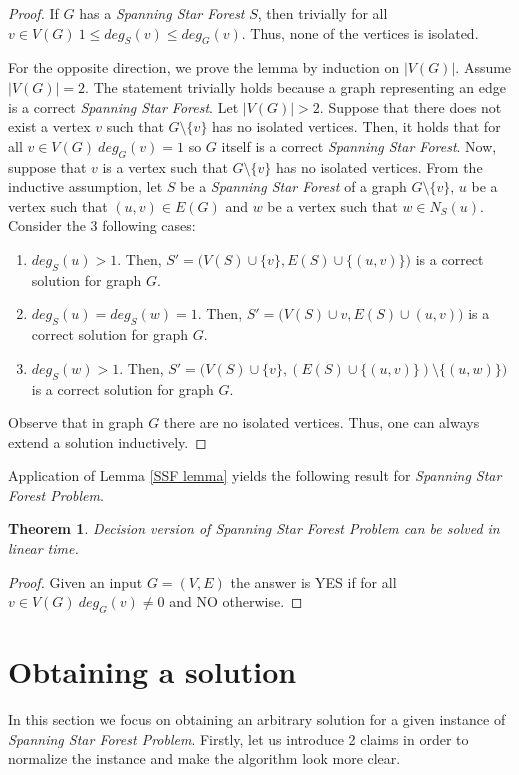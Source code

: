 \documentclass[en]{pracamgr}
\newtheorem{theorem}{Theorem}
\newcommand{\ssf}{\emph{Spanning Star Forest}}
\newcommand{\ssfp}{\emph{Spanning Star Forest Problem}}
\begin{document}
\begin{proof}
	If $G$ has a \ssf{} $S$, then trivially for all $v \in V(G)\ 1 \leq deg_S(v) \leq deg_G(v)$. Thus, none of the vertices is isolated.
	
	For the opposite direction, we prove the lemma by induction on $|V(G)|$. Assume ${|V(G)|=2}$. The statement trivially holds because a graph representing an edge is a correct \ssf. Let $|V(G)| >2$. Suppose that there does not exist a vertex $v$ such that $G \setminus \{v\}$ has no isolated vertices. Then, it holds that for all $v \in V(G)\ deg_G(v)=1$ so $G$ itself	is a correct \ssf{}. Now, suppose that $v$ is a vertex such that $G \setminus \{v\}$ has no isolated vertices. From the inductive assumption, let $S$ be a \ssf{} of a graph $G \setminus \{v\}$, $u$ be a vertex such that $(u,v) \in E(G)$ and $w$ be a vertex such that $w \in N_S(u)$. Consider the 3 following cases:
	\begin{enumerate}
		\item $deg_S(u) > 1$. Then, $S'=\big(V(S) \cup \{v\}, E(S) \cup \{(u,v)\}\big)$ is a correct solution for graph $G$.
		\item $deg_S(u) = deg_S(w) = 1$. Then, $S'=\big(V(S) \cup {v}, E(S) \cup
		(u,v)\big)$ is a correct solution for graph $G$.
		\item $deg_S(w) > 1$. Then, $S'=\big(V(S) \cup \{v\}, 
		(E(S) \cup \{(u,v)\}) \setminus \{(u,w)\}\big)$ is a correct solution for graph $G$.
	\end{enumerate}
		Observe that in graph $G$ there are no isolated vertices. Thus, one can always extend a solution inductively.
	
\end{proof}
	Application of Lemma \ref{SSF lemma} yields the following result for \ssfp{}.

\begin{theorem}
	Decision version of \ssfp{} can be solved in linear time.
\end{theorem}

\begin{proof}
	Given an input $G = (V,E)$ the answer is YES if for all $v \in V(G)\ deg_G(v) \neq 0$ and NO otherwise.
\end{proof}

\section{Obtaining a solution}

In this section we focus on obtaining an arbitrary solution for a given instance of \ssfp{}. Firstly, let us introduce 2 claims in order to normalize the instance and make the algorithm look more clear.
\end{document}
